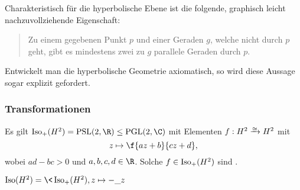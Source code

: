 Charakteristisch für die hyperbolische Ebene ist die folgende, graphisch leicht nachzuvollziehende Eigenschaft:
\begin{quote}
	Zu einem gegebenen Punkt $p$ und einer Geraden $g$, welche nicht durch $p$ geht, gibt es mindestens zwei zu $g$ parallele Geraden durch $p$.
\end{quote}
Entwickelt man die hyperbolische Geometrie axiomatisch, so wird diese Aussage sogar explizit gefordert.

\subsubsection{Transformationen}

Es gilt $\Iso_+(H^2) = \PSL(2, \R) \le \PGL(2, \C)$ mit Elementen
$f: H^2 \isomorphicto H^2$ mit
\[
	z \mapsto \f{az + b}{cz + d},
\]
wobei $ad - bc > 0$ und $a,b,c,d \in \R$.
Solche $f \in \operatorname{Iso}_+(H^2)$ sind .

$\Iso(H^2) = \< \Iso_+(H^2), z \mapsto -\_ z\>$

